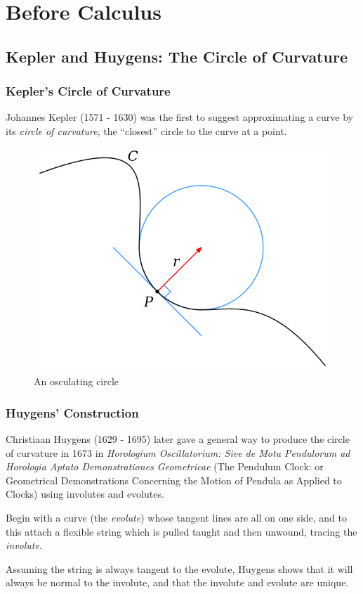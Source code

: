 \documentclass{beamer}
\theoremstyle{definition}
\begin{document}
\section{Before Calculus}

\subsection{Kepler and Huygens: The Circle of Curvature}

\begin{frame}
    \frametitle{Kepler's Circle of Curvature}

    Johannes Kepler (1571 - 1630) was the first to suggest approximating a curve by
    its \emph{circle of curvature}, the ``closest'' circle to the curve at a point.
    \cite{unsat-hist}

    \begin{figure}
        \centering
        \includegraphics[width=.5\textwidth]{images/Osculating_circle.svg.png}
        \caption{An osculating circle \cite{intern-et-al}}
    \end{figure}
\end{frame}

\begin{frame}
    \frametitle{Huygens' Construction}

    Christiaan Huygens (1629 - 1695) later gave a general way to produce the
    circle of curvature in 1673 in \textit{Horologium Oscillatorium: Sive de Motu Pendulorum
    ad Horologia Aptato Demonstrationes Geometricae}
    (The Pendulum Clock: or Geometrical Demonstrations Concerning the Motion of Pendula as
    Applied to Clocks) using involutes and evolutes.

    Begin with a curve (the \emph{evolute}) whose tangent lines are all on one side,
    and to this attach a flexible string which is pulled taught and then unwound,
    tracing the \emph{involute}.

    Assuming the string is always tangent to the evolute, Huygens shows that it will
    always be normal to the involute, and that the involute and evolute are unique.

\end{frame}
\end{document}
